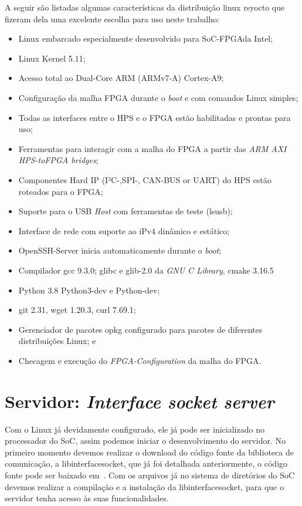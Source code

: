 A seguir são listadas algumas características da distribuição linux rsyocto que fizeram dela uma excelente escolha para uso neste trabalho:
\begin{itemize}
	\item Linux embarcado especialmente desenvolvido para SoC-FPGAda Intel;
	\item Linux Kernel 5.11;
	\item Acesso total ao Dual-Core ARM (ARMv7-A) Cortex-A9;
	\item Configuração da malha FPGA durante o \textit{boot} e com comandos Linux simples;
	\item Todas as interfaces entre o HPS e o FPGA estão habilitadas e prontas para uso;
	\item Ferramentas para interagir com a malha do FPGA a partir das \textit{ARM AXI HPS-toFPGA bridges};
	\item Componentes Hard IP (I²C-,SPI-, CAN-BUS or UART) do HPS estão roteados para o FPGA\@;
	\item Suporte para o USB \textit{Host} com ferramentas de teste (lsusb);
	\item Interface de rede com suporte ao iPv4 dinâmico e estático;
	\item OpenSSH-Server inicia automaticamente durante o \textit{boot};
	\item Compilador gcc 9.3.0; glibc e glib-2.0 da \textit{GNU C Library}, cmake 3.16.5
	\item Python 3.8 Python3-dev e Python-dev;
	\item git 2.31, wget 1.20.3, curl 7.69.1; 
	\item Gerenciador de pacotes opkg configurado para pacotes de diferentes distribuições Linux; e
	\item Checagem e execução do \textit{FPGA-Configuration} da malha do FPGA\@.
	\end{itemize}

\section{Servidor: \textit{Interface socket server}}
Com o Linux já devidamente configurado, ele já pode ser inicializado no processador do SoC, assim podemos iniciar o desenvolvimento do servidor. No primeiro momento devemos realizar o download do código fonte da biblioteca de comunicação, a libinterfacesocket, que já foi detalhada anteriormente, o código fonte pode ser baixado em~\cite{interface-socket-server}. Com os arquivos já no sistema de diretórios do SoC devemos realizar a compilação e a instalação da libinterfacesocket, para que o servidor tenha acesso às suas funcionalidades. 

